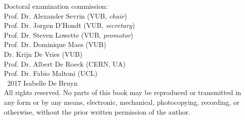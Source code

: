 \documentclass[11pt,b5paper,twoside,dutch,english]{book}
\begin{document}
 
\clearpage{\pagestyle{empty}\cleardoublepage}
 
\clearpage
\thispagestyle{empty}
\large
 \noindent
Doctoral examination commission:\\

 \noindent
Prof. Dr. Alexander Sevrin (VUB, \textit{chair})\\
Prof. Dr. Jorgen D'Hondt (VUB, \textit{secretary})\\
Prof. Dr. Steven Lowette (VUB, \textit{promotor})\\
Prof. Dr. Dominique Maes (VUB)\\
Dr. Krijn De Vries (VUB)\\
Prof. Dr. Albert De Roeck (CERN, UA)\\
Prof. Dr. Fabio Maltoni (UCL)\\

% 
% 
% 
\vfill
 \noindent
\textcopyright\ 2017 Isabelle De Bruyn\\

 \noindent
All rights reserved. No parts of this book may be reproduced or transmitted in any form or by any means, electronic, mechanical, photocopying, recording, or otherwise, without the prior written permission of the author.
\normalsize
% 

\clearpage{\pagestyle{empty}\cleardoublepage}



\frontmatter



\end{document}
